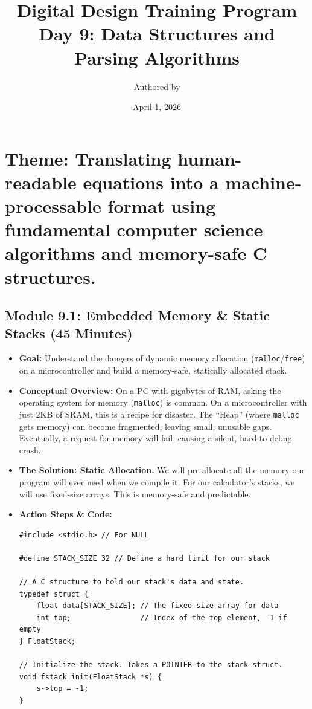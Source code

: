 \documentclass[11pt,a4paper]{article}
\title{Digital Design Training Program \\ \large Day 9: Data Structures and Parsing Algorithms}
\author{Authored by }
\date{April 1, 2026}
\begin{document}
\maketitle

\section*{Theme: Translating human-readable equations into a machine-processable format using fundamental computer science algorithms and memory-safe C structures.}

\subsection*{Module 9.1: Embedded Memory \& Static Stacks (45 Minutes)}

\begin{itemize}
    \item \textbf{Goal:} Understand the dangers of dynamic memory allocation (\verb|malloc|/\verb|free|) on a microcontroller and build a memory-safe, statically allocated stack.
    \item \textbf{Conceptual Overview:} On a PC with gigabytes of RAM, asking the operating system for memory (\verb|malloc|) is common. On a microcontroller with just 2KB of SRAM, this is a recipe for disaster. The ``Heap'' (where \verb|malloc| gets memory) can become fragmented, leaving small, unusable gaps. Eventually, a request for memory will fail, causing a silent, hard-to-debug crash.
    \item \textbf{The Solution: Static Allocation.} We will pre-allocate all the memory our program will ever need when we compile it. For our calculator's stacks, we will use fixed-size arrays. This is memory-safe and predictable.
    \item \textbf{Action Steps \& Code:}
\begin{lstlisting}[caption={Code for Module 9.1: A Memory-Safe Static Stack}]
#include <stdio.h> // For NULL

#define STACK_SIZE 32 // Define a hard limit for our stack

// A C structure to hold our stack's data and state.
typedef struct {
    float data[STACK_SIZE]; // The fixed-size array for data
    int top;                // Index of the top element, -1 if empty
} FloatStack;

// Initialize the stack. Takes a POINTER to the stack struct.
void fstack_init(FloatStack *s) {
    s->top = -1;
}


\end{lstlisting}
\end{itemize}
\end{document}
